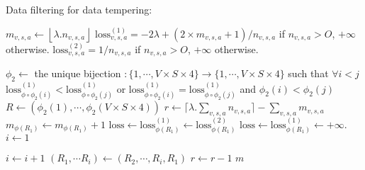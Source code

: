 \documentclass{article}
\begin{document}
\begin{algorithm}[H]
\caption{Data filtering for data tempering: }
\label{alg:strat2}
\begin{algorithmic}


\State $m_{v,s,a}\gets\left\lfloor \lambda. n_{v,s,a}\right\rfloor$
\State $\mathrm{loss}_{v,s,a}^{(1)}=-2\lambda+(2\times m_{v,s,a}+1)/n_{v,s,a}$ if $n_{v,s,a}>O$, $+\infty$ otherwise.
\State $\mathrm{loss}_{v,s,a}^{(2)}=1/n_{v,s,a}$ if $n_{v,s,a}>O$, $+\infty$ otherwise.

\EndFor
\State $\phi_2\gets$  the unique bijection 
$:\{1,\cdots,V\times S\times 4\}\to\{1,\cdots,V\times S\times 4\}$ such that 
$\forall i<j$ $\mathrm{loss}^{(1)}_{\phi\circ\phi_2(i)} <\mathrm{loss}^{(1)}_{\phi\circ\phi_2(j)}$ or 
$\mathrm{loss}^{(1)}_{\phi\circ\phi_2(i)}=\mathrm{loss}^{(1)}_{\phi\circ\phi_2(j)}$ and $\phi_2(i)<\phi_2(j)$
\State $R\gets\left(\phi_2(1),\cdots, \phi_2(V\times S\times 4)\right)$
\State $r\gets  \lceil \lambda.\sum_{v,s,a}n_{v,s,a}\rceil- \sum_{v,s,a}m_{v,s,a} $
    \State $m_{\phi(R_1)}\gets     m_{\phi(R_1)}+1$
    \State $\mathrm{loss}\gets \mathrm{loss}^{(1)}_{\phi(R_1)}\gets \mathrm{loss}^{(2)}_{\phi(R_1)}$ 
    \Else
    \State $\mathrm{loss}\gets \mathrm{loss}^{(1)}_{\phi(R_1)}\gets +\infty$.
    \EndIf
    \State $i\gets 1$
    
    \State    $i\gets{i+1}$
    \EndWhile
        \State $(R_1,\cdots R_i)\gets (R_2,\cdots, R_i,R_1)$
    \EndIf 
    \State $r\gets r-1$
    \EndWhile
    \State \Return $m$
\EndProcedure
\end{algorithmic}
\end{algorithm}
\end{document}

